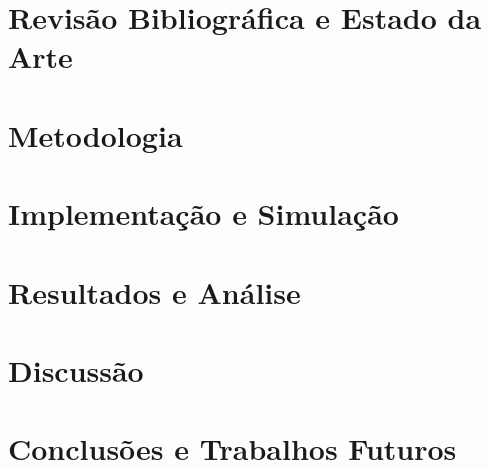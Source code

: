 \documentclass[12pt,Final,Portugues]{tese-FT}
\begin{document}
\chapter{Revisão Bibliográfica e Estado da Arte}


\chapter{Metodologia}


\chapter{Implementação e Simulação}


\chapter{Resultados e Análise}


\chapter{Discussão}


\chapter{Conclusões e Trabalhos Futuros}


\printbibliography[title=Referências Bibliográficas]

\appendix

\end{document}
